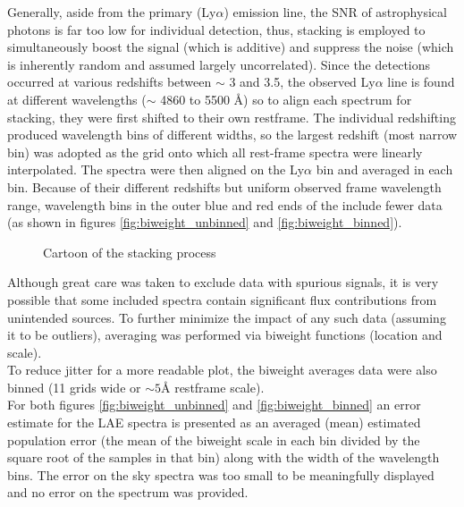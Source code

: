 \documentclass{aastex62}
\begin{document}
Generally, aside from the primary (Ly$\alpha$) emission line, the SNR of astrophysical photons is far too low for individual detection, thus, stacking is employed to simultaneously boost the signal (which is additive) and suppress the noise (which is inherently random and assumed largely uncorrelated). Since the detections occurred at various redshifts between $\sim$ 3 and 3.5, the observed Ly$\alpha$ line is found at different wavelengths ($\sim$ 4860 to 5500 $\mbox{\AA}$) so to align each spectrum for stacking, they were first shifted to their own restframe. The individual redshifting produced wavelength bins of different widths, so the largest redshift (most narrow bin) was adopted as the grid onto which all rest-frame spectra were linearly interpolated. The spectra were then aligned on the Ly$\alpha$ bin and averaged in each bin. Because of their different redshifts but uniform observed frame wavelength range, wavelength bins in the outer blue and red ends of the include fewer data (as shown in figures \ref{fig:biweight_unbinned} and \ref{fig:biweight_binned}).\\

\begin{figure}[H]

\caption{Cartoon of the stacking process\label{fig:stacking cartoon}}
\end{figure}

\pagebreak

Although great care was taken to exclude data with spurious signals, it is very possible that some included spectra contain significant flux contributions from unintended sources. To further minimize the impact of any such data (assuming it to be outliers), averaging was performed via biweight functions (location and scale).\\

To reduce jitter for a more readable plot, the biweight averages data were also binned (11 grids wide or $\sim 5 \mbox{\AA}$ restframe scale).\\

For both figures \ref{fig:biweight_unbinned} and \ref{fig:biweight_binned} an error estimate for the LAE spectra is presented as an averaged (mean) estimated population error (the mean of the biweight scale in each bin divided by the square root of the samples in that bin) along with the width of the wavelength bins. The error on the sky spectra was too small to be meaningfully displayed and no error on the \cite{Steidel} spectrum was provided.\\
\end{document}
